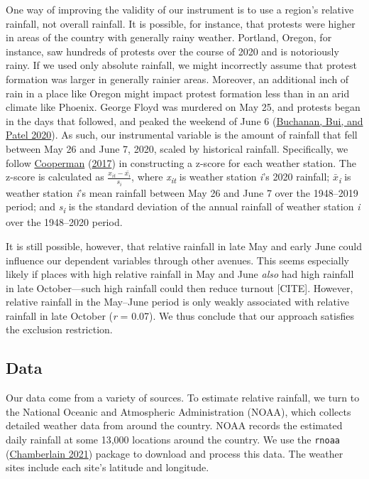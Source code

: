 \documentclass[
  12pt,
]{article}
\begin{document}
One way of improving the validity of our instrument is to use a region's relative rainfall, not overall rainfall. It is possible, for instance, that protests were higher in areas of the country with generally rainy weather. Portland, Oregon, for instance, saw hundreds of protests over the course of 2020 and is notoriously rainy. If we used only absolute rainfall, we might incorrectly assume that protest formation was larger in generally rainier areas. Moreover, an additional inch of rain in a place like Oregon might impact protest formation less than in an arid climate like Phoenix. George Floyd was murdered on May 25, and protests began in the days that followed, and peaked the weekend of June 6 (\protect\hyperlink{ref-Buchanan2020}{Buchanan, Bui, and Patel 2020}). As such, our instrumental variable is the amount of rainfall that fell between May 26 and June 7, 2020, scaled by historical rainfall. Specifically, we follow \protect\hyperlink{ref-Cooperman2017}{Cooperman} (\protect\hyperlink{ref-Cooperman2017}{2017}) in constructing a z-score for each weather station. The z-score is calculated as \(\frac{x_{it} - \bar{x_{i}}}{s_{i}}\), where \emph{x\textsubscript{it}} is weather station \emph{i}'s 2020 rainfall; \(\bar{x}\)\emph{\textsubscript{i}} is weather station \emph{i}'s mean rainfall between May 26 and June 7 over the 1948--2019 period; and \emph{s\textsubscript{i}} is the standard deviation of the annual rainfall of weather station \emph{i} over the 1948--2020 period.

It is still possible, however, that relative rainfall in late May and early June could influence our dependent variables through other avenues. This seems especially likely if places with high relative rainfall in May and June \emph{also} had high rainfall in late October---such high rainfall could then reduce turnout {[}CITE{]}. However, relative rainfall in the May--June period is only weakly associated with relative rainfall in late October (\emph{r} = 0.07). We thus conclude that our approach satisfies the exclusion restriction.

\hypertarget{data}{%
\subsection*{Data}\label{data}}

Our data come from a variety of sources. To estimate relative rainfall, we turn to the National Oceanic and Atmospheric Administration (NOAA), which collects detailed weather data from around the country. NOAA records the estimated daily rainfall at some 13,000 locations around the country. We use the \texttt{rnoaa} (\protect\hyperlink{ref-Chamberlain2021}{Chamberlain 2021}) package to download and process this data. The weather sites include each site's latitude and longitude.
\end{document}
